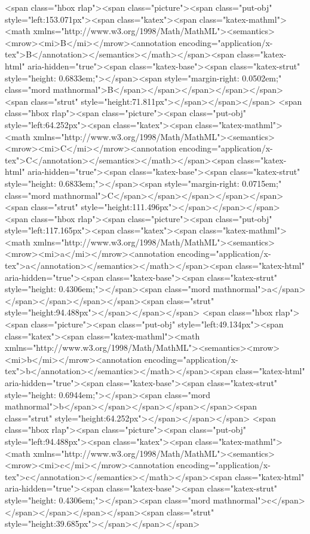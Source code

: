<span class="hbox rlap"><span class="picture"><span class="put-obj" style="left:153.071px"><span class="katex"><span class="katex-mathml"><math xmlns="http://www.w3.org/1998/Math/MathML"><semantics><mrow><mi>B</mi></mrow><annotation encoding="application/x-tex">B</annotation></semantics></math></span><span class="katex-html" aria-hidden="true"><span class="katex-base"><span class="katex-strut" style="height: 0.6833em;"></span><span style="margin-right: 0.0502em;" class="mord mathnormal">B</span></span></span></span></span><span class="strut" style="height:71.811px"></span></span></span>
<span class="hbox rlap"><span class="picture"><span class="put-obj" style="left:64.252px"><span class="katex"><span class="katex-mathml"><math xmlns="http://www.w3.org/1998/Math/MathML"><semantics><mrow><mi>C</mi></mrow><annotation encoding="application/x-tex">C</annotation></semantics></math></span><span class="katex-html" aria-hidden="true"><span class="katex-base"><span class="katex-strut" style="height: 0.6833em;"></span><span style="margin-right: 0.0715em;" class="mord mathnormal">C</span></span></span></span></span><span class="strut" style="height:111.496px"></span></span></span>
<span class="hbox rlap"><span class="picture"><span class="put-obj" style="left:117.165px"><span class="katex"><span class="katex-mathml"><math xmlns="http://www.w3.org/1998/Math/MathML"><semantics><mrow><mi>a</mi></mrow><annotation encoding="application/x-tex">a</annotation></semantics></math></span><span class="katex-html" aria-hidden="true"><span class="katex-base"><span class="katex-strut" style="height: 0.4306em;"></span><span class="mord mathnormal">a</span></span></span></span></span><span class="strut" style="height:94.488px"></span></span></span>
<span class="hbox rlap"><span class="picture"><span class="put-obj" style="left:49.134px"><span class="katex"><span class="katex-mathml"><math xmlns="http://www.w3.org/1998/Math/MathML"><semantics><mrow><mi>b</mi></mrow><annotation encoding="application/x-tex">b</annotation></semantics></math></span><span class="katex-html" aria-hidden="true"><span class="katex-base"><span class="katex-strut" style="height: 0.6944em;"></span><span class="mord mathnormal">b</span></span></span></span></span><span class="strut" style="height:64.252px"></span></span></span>
<span class="hbox rlap"><span class="picture"><span class="put-obj" style="left:94.488px"><span class="katex"><span class="katex-mathml"><math xmlns="http://www.w3.org/1998/Math/MathML"><semantics><mrow><mi>c</mi></mrow><annotation encoding="application/x-tex">c</annotation></semantics></math></span><span class="katex-html" aria-hidden="true"><span class="katex-base"><span class="katex-strut" style="height: 0.4306em;"></span><span class="mord mathnormal">c</span></span></span></span></span><span class="strut" style="height:39.685px"></span></span></span>
